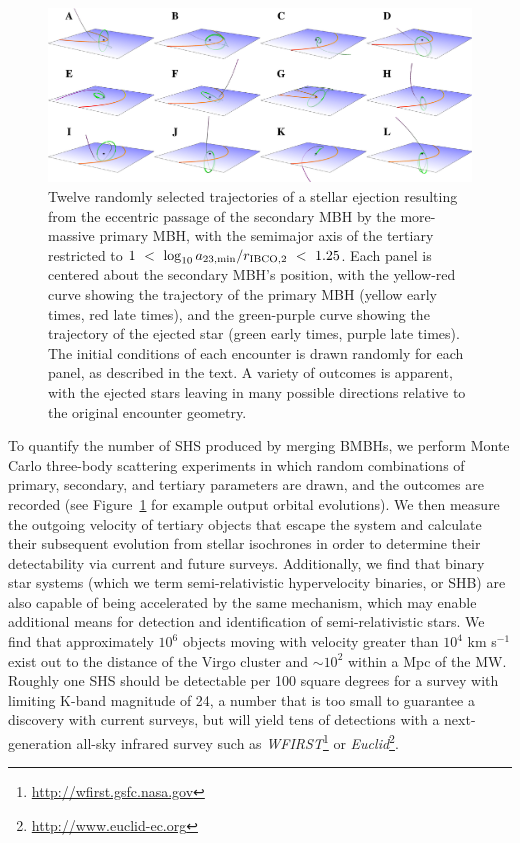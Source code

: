 \documentclass[a4paper,twocolumn]{emulateapj}
\begin{document}
{\begin{figure}
\centering\includegraphics[width=\linewidth,clip=true]{nbody-examples}
\caption{Twelve randomly selected trajectories of a stellar ejection resulting from the eccentric passage of the secondary MBH by the more-massive primary MBH, with the semimajor axis of the tertiary restricted to $1~<~\log_{10} a_{23,\min}/r_{\rm IBCO,2}~<~1.25$. Each panel is centered about the secondary MBH's position, with the yellow-red curve showing the trajectory of the primary MBH (yellow early times, red late times), and the green-purple curve showing the trajectory of the ejected star (green early times, purple late times). The initial conditions of each encounter is drawn randomly for each panel, as described in the text. A variety of outcomes is apparent, with the ejected stars leaving in many possible directions relative to the original encounter geometry.}
\label{fig:examples}
\end{figure}

To quantify the number of SHS produced by merging BMBHs, we perform Monte Carlo three-body scattering experiments in which random combinations of primary, secondary, and tertiary parameters are drawn, and the outcomes are recorded (see Figure~\ref{fig:examples} for example output orbital evolutions). We then measure the outgoing velocity of tertiary objects that escape the system and calculate their subsequent evolution from stellar isochrones in order to determine their detectability via current and future surveys. Additionally, we find that binary star systems (which we term semi-relativistic hypervelocity binaries, or SHB) are also capable of being accelerated by the same mechanism, which may enable additional means for detection and identification of semi-relativistic stars. We find that approximately $10^{6}$ objects moving with velocity greater than $10^{4}$ km s$^{-1}$ exist out to the distance of the Virgo cluster and $\sim 10^{2}$ within a Mpc of the MW. Roughly one SHS should be detectable per 100 square degrees for a survey with limiting K-band magnitude of 24, a number that is too small to guarantee a discovery with current surveys, but will yield tens of detections with a next-generation all-sky infrared survey such as {\it WFIRST}\footnote{\url{http://wfirst.gsfc.nasa.gov}} or {\it Euclid}\footnote{\url{http://www.euclid-ec.org}}.

}
\end{document}
